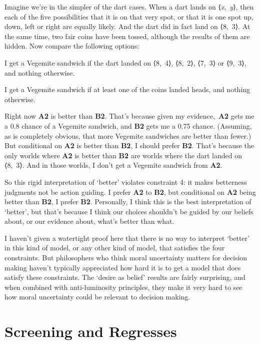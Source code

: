 \documentclass[
  10pt,
  letterpaper,
  twoside]{scrbook}
\providecommand{\tightlist}{%
  \setlength{\itemsep}{0pt}\setlength{\parskip}{0pt}}\usepackage{longtable,booktabs,array}
\begin{document}
Imagine we're in the simpler of the dart cases. When a dart lands on
⟨\emph{x},~\emph{y}⟩, then each of the five possibilities that it is on
that very spot, or that it is one spot up, down, left or right are
equally likely. And the dart did in fact land on ⟨8,~3⟩. At the same
time, two fair coins have been tossed, although the results of them are
hidden. Now compare the following options:

\begin{description}
\tightlist
\item[A2]
I get a Vegemite sandwich if the dart landed on ⟨8,~4⟩, ⟨8,~2⟩, ⟨7,~3⟩
or ⟨9,~3⟩, and nothing otherwise.
\item[B2]
I get a Vegemite sandwich if at least one of the coins landed heads, and
nothing otherwise.
\end{description}

Right now \textbf{A2} is better than \textbf{B2}. That's because given
my evidence,~\textbf{A2} gets me a 0.8 chance of a Vegemite sandwich,
and \textbf{B2} gets me a 0.75 chance. (Assuming, as is completely
obvious, that more Vegemite sandwiches are better than fewer.) But
conditional on \textbf{A2} is better than \textbf{B2}, I should prefer
\textbf{B2}. That's because the only worlds where \textbf{A2} is better
than \textbf{B2} are worlds where the dart landed on ⟨8,~3⟩. And in
those worlds, I don't get a Vegemite sandwich from \textbf{A2}.

So this rigid interpretation of `better' violates constraint 4: it makes
betterness judgments not be action guiding. I prefer \textbf{A2} to
\textbf{B2}, but conditional on \textbf{A2} being better than
\textbf{B2}, I prefer \textbf{B2}. Personally, I think this is the best
interpretation of `better', but that's because I think our choices
shouldn't be guided by our beliefs about, or our evidence about, what's
better than what.

I haven't given a watertight proof here that there is no way to
interpret `better' in this kind of model, or any other kind of model,
that satisfies the four constraints. But philosophers who think moral
uncertainty matters for decision making haven't typically appreciated
how hard it is to get a model that does satisfy these constraints. The
`desire as belief' results are fairly surprising, and when combined with
anti-luminosity principles, they make it very hard to see how moral
uncertainty could be relevant to decision making.

\chapter{Screening and Regresses}\label{screeningandregresses}
\end{document}
